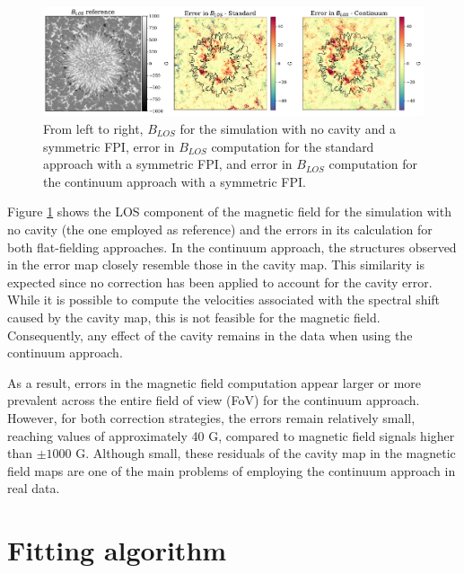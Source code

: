 \begin{figure}
  \includegraphics[width=\textwidth]{figures/Mancha/blos_errors.pdf}
  \caption[Error in Blos calculation.]{
    From left to right, $B_{LOS}$ for the simulation with no cavity and a symmetric FPI, error in $B_{LOS}$ computation for the standard approach with a symmetric FPI, and error in $B_{LOS}$ computation for the continuum approach with a symmetric FPI. 
    \label{fig_mancha: blos_errors}}
\end{figure}

Figure \ref{fig_mancha: blos_errors} shows the LOS component of the magnetic field for the simulation with no cavity (the one employed as reference) and the errors in its calculation for both flat-fielding approaches.  In the continuum approach, the structures observed in the error map closely resemble those in the cavity map. This similarity is expected since no correction has been applied to account for the cavity error. While it is possible to compute the velocities associated with the spectral shift caused by the cavity map, this is not feasible for the magnetic field. Consequently, any effect of the cavity remains in the data when using the continuum approach.

As a result, errors in the magnetic field computation appear larger or more prevalent across the entire field of view (FoV) for the continuum approach. However, for both correction strategies, the errors remain relatively small, reaching values of approximately 40 G, compared to magnetic field signals higher than $\pm 1000$ G. Although small, these residuals of the cavity map in the magnetic field maps are one of the main problems of employing the continuum approach in real data.

\section{\label{sect: etalon_corr_fitting}Fitting algorithm}

